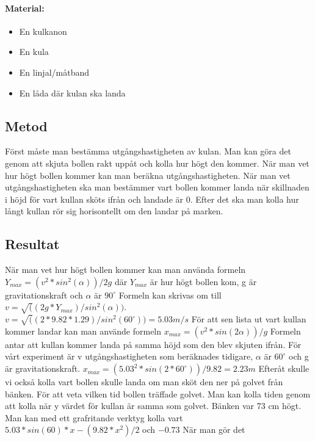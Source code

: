 \documentclass[11p]{article}
\begin{document}
    \paragraph{Material:}
    \begin{itemize}
        \item En kulkanon
        \item En kula
        \item En linjal/måtband
        \item En låda där kulan ska landa
    \end{itemize}
    \subsection{Metod}
    Först måste man bestämma utgångshastigheten av kulan.
    Man kan göra det genom att skjuta bollen rakt uppåt och kolla hur högt den kommer.
    När man vet hur högt bollen kommer kan man beräkna utgångshastigheten.
    När man vet utgångshastigheten ska man bestämmer vart bollen kommer landa när skillnaden i höjd för vart kullan sköts ifrån och landade är 0.
    Efter det ska man kolla hur långt kullan rör sig horisontellt om den landar på marken.

    \subsection{Resultat}
    När man vet hur högt bollen kommer kan man använda formeln $Y_{max}=(v^2 * sin^2(\alpha))/2g$ där $Y_{max}$ är hur högt bollen kom, g är gravitationskraft och $\alpha$ är $90^{\circ}$
    Formeln kan skrivas om till $v=\sqrt((2g*Y_{max})/sin^2(\alpha))$.
    \newline $v=\sqrt((2*9.82*1.29)/sin^2(60^{\circ})) = 5.03 m/s$
    \newline\newline
    För att sen lista ut vart kullan kommer landar kan man använde formeln $x_{max}=(v^2*sin(2\alpha))/g$
    Formeln antar att kullan kommer landa på samma höjd som den blev skjuten ifrån.
    För vårt experiment är v utgångshastigheten som beräknades tidigare, $\alpha$ är $60^{\circ}$ och g är gravitationskraft.
    \newline $x_{max}=(5.03^2*sin(2*60^{\circ}))/9.82 = 2.23 m$
    \newline\newline
    Efteråt skulle vi också kolla vart bollen skulle landa om man sköt den ner på golvet från bänken.
    För att veta vilken tid bollen träffade golvet.
    Man kan kolla tiden genom att kolla när y värdet för kullan är samma som golvet.
    Bänken var 73 cm högt.
    Man kan med ett grafritande verktyg kolla vart $5.03*sin(60)*x-(9.82*x^2)/2$ och $-0.73$
    När man gör det 
\end{document}
